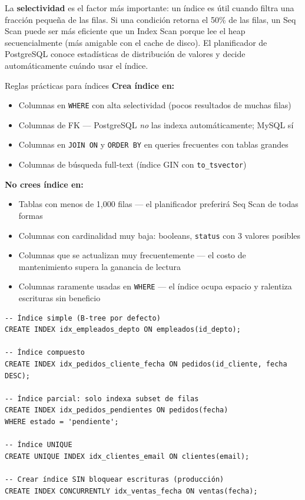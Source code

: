 La \textbf{selectividad} es el factor más importante: un índice es útil cuando filtra una fracción pequeña de las filas.
Si una condición retorna el 50\% de las filas, un Seq Scan puede ser más eficiente que un Index Scan porque lee el heap secuencialmente (más amigable con el cache de disco).
El planificador de PostgreSQL conoce estadísticas de distribución de valores y decide automáticamente cuándo usar el índice.

\begin{tipbox}{Reglas prácticas para índices}
\textbf{Crea índice en:}
\begin{itemize}
  \item Columnas en \texttt{WHERE} con alta selectividad (pocos resultados de muchas filas)
  \item Columnas de FK — PostgreSQL \emph{no} las indexa automáticamente; MySQL sí
  \item Columnas en \texttt{JOIN ON} y \texttt{ORDER BY} en queries frecuentes con tablas grandes
  \item Columnas de búsqueda full-text (índice GIN con \texttt{to\_tsvector})
\end{itemize}
\textbf{No crees índice en:}
\begin{itemize}
  \item Tablas con menos de 1{,}000 filas — el planificador preferirá Seq Scan de todas formas
  \item Columnas con cardinalidad muy baja: booleans, \texttt{status} con 3 valores posibles
  \item Columnas que se actualizan muy frecuentemente — el costo de mantenimiento supera la ganancia de lectura
  \item Columnas raramente usadas en \texttt{WHERE} — el índice ocupa espacio y ralentiza escrituras sin beneficio
\end{itemize}
\end{tipbox}

\begin{lstlisting}[caption={Crear índices B-tree, parcial y compuesto}]
-- Índice simple (B-tree por defecto)
CREATE INDEX idx_empleados_depto ON empleados(id_depto);

-- Índice compuesto
CREATE INDEX idx_pedidos_cliente_fecha ON pedidos(id_cliente, fecha DESC);

-- Índice parcial: solo indexa subset de filas
CREATE INDEX idx_pedidos_pendientes ON pedidos(fecha)
WHERE estado = 'pendiente';

-- Índice UNIQUE
CREATE UNIQUE INDEX idx_clientes_email ON clientes(email);

-- Crear índice SIN bloquear escrituras (producción)
CREATE INDEX CONCURRENTLY idx_ventas_fecha ON ventas(fecha);
\end{lstlisting}

